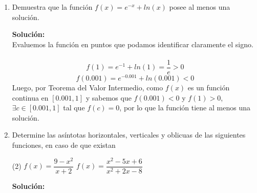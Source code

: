 \documentclass[12pt]{article}
\newenvironment{solucion}
{\begin{mdframed}[backgroundcolor=black!10]
		{\bf Solución:}\\
	}
	{
	\end{mdframed}
}
\newenvironment{preguntas}
{\begin{enumerate}\itemsep12pt
	}
	{
	\end{enumerate}
}
\begin{document}
\begin{preguntas}
\item Demuestra que la función $f(x) = e^{-x} + ln(x)$ posee al menos una solución.
\begin{solucion}
Evaluemos la función en puntos que podamos identificar claramente el signo.\\
\\
$$f(1) = e^{-1} + ln(1) = \dfrac{1}{e} > 0$$
$$f(0.001) = e^{-0.001} + ln(0.001) < 0$$
Luego, por Teorema del Valor Intermedio, como $f(x)$ es un función continua en $[0.001, 1]$ y sabemos que $f(0.001) < 0$ y $f(1) > 0$, $\exists c \in [0.001, 1]$ tal que $f(c) = 0$, por lo que la función tiene al menos una solución.
\end{solucion}
\item Determine las asíntotas horizontales, verticales y oblicuas de las siguientes funciones, en caso de que existan
\begin{tasks}(2)
\task $f(x) = \dfrac{9-x^2}{x+2}$
\task $f(x) = \dfrac{x^2-5x+6}{x^2+2x-8}$
\end{tasks}
\begin{solucion}


\end{solucion}
\end{preguntas}
\end{document}
